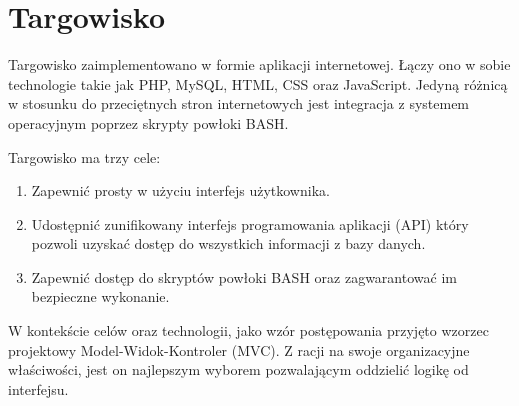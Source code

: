 \documentclass[11pt,a4paper,polish,thesis]{dcsbook}
\begin{document}
\section{Targowisko}
Targowisko zaimplementowano w formie aplikacji internetowej. Łączy ono w sobie technologie takie jak PHP, MySQL, HTML, CSS oraz JavaScript. Jedyną różnicą w stosunku
do przeciętnych stron internetowych jest integracja z systemem operacyjnym poprzez skrypty powłoki BASH.

Targowisko ma trzy cele:
\begin{enumerate}
\item Zapewnić prosty w użyciu interfejs użytkownika.
\item Udostępnić zunifikowany interfejs programowania aplikacji (API) który pozwoli uzyskać dostęp do wszystkich informacji z bazy danych.
\item Zapewnić dostęp do skryptów powłoki BASH oraz zagwarantować im bezpieczne wykonanie.
\end{enumerate}

W kontekście celów oraz technologii, jako wzór postępowania przyjęto wzorzec projektowy Model-Widok-Kontroler (MVC). Z racji na swoje organizacyjne właściwości, jest
on najlepszym wyborem pozwalającym oddzielić logikę od interfejsu.
\end{document}
